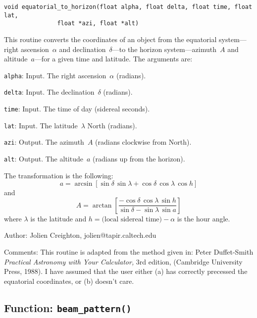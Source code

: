 \begin{verbatim}
void equatorial_to_horizon(float alpha, float delta, float time, float lat,
			   float *azi, float *alt)
\end{verbatim}

This routine converts the coordinates of an object from the equatorial
system---right ascension~$\alpha$ and declination~$\delta$---to the horizon
system---azimuth~$A$ and altitude~$a$---for a given time and latitude.
The arguments are:
\begin{description}
\item{\texttt{alpha}}: Input.  The right ascension~$\alpha$ (radians).
\item{\texttt{delta}}: Input.  The declination~$\delta$ (radians).
\item{\texttt{time}}: Input.  The time of day (sidereal seconds).
\item{\texttt{lat}}: Input.  The latitude~$\lambda$ North (radians).
\item{\texttt{azi}}: Output.  The azimuth~$A$ (radians clockwise from North).
\item{\texttt{alt}}: Output.  The altitude~$a$ (radians up from the horizon).
\end{description}

The transformation is the following:
\begin{equation}
  a = \arcsin[ \sin\delta\, \sin\lambda + \cos\delta\, \cos\lambda\, \cos h ]
\end{equation}
and
\begin{equation}
  A = \arctan\left[ \frac{-\cos\delta\, \cos\lambda\, \sin h}
                         {\sin\delta - \sin\lambda\, \sin a} \right]
\end{equation}
where $\lambda$ is the latitude and $h=\mbox{(local sidereal time)}-\alpha$ is
the hour angle.

\begin{description}
\item{Author:} Jolien Creighton, jolien@tapir.caltech.edu
\item{Comments:}  This routine is adapted from the method given in:
  Peter Duffet-Smith \emph{Practical Astronomy with Your Calculator,}
  3rd edition,
  (Cambridge University Press, 1988).  I have assumed that the user either
  (a) has correctly precessed the equatorial coordinates, or (b) doesn't care.
\end{description}


\clearpage
\subsection{Function: \texttt{beam\_pattern()}}
\label{ss:beam_pattern}

